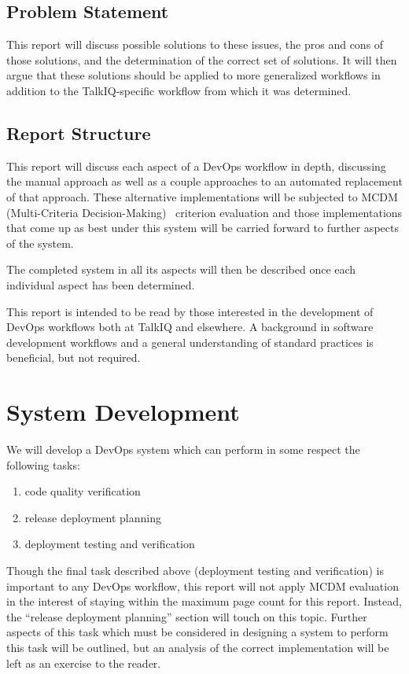 \documentclass[12pt]{article}
\begin{document}
\subsection{Problem Statement}
This report will discuss possible solutions to these issues, the pros and cons of those solutions, and the determination of the correct set of solutions. It will then argue that these solutions should be applied to more generalized workflows in addition to the TalkIQ-specific workflow from which it was determined.

\subsection{Report Structure}
This report will discuss each aspect of a DevOps workflow in depth, discussing the manual approach as well as a couple approaches to an automated replacement of that approach. These alternative implementations will be subjected to MCDM (Multi-Criteria Decision-Making)~\cite{mcda} criterion evaluation and those implementations that come up as best under this system will be carried forward to further aspects of the system.

The completed system in all its aspects will then be described once each individual aspect has been determined.

This report is intended to be read by those interested in the development of DevOps workflows both at TalkIQ and elsewhere. A background in software development workflows and a general understanding of standard practices is beneficial, but not required.
\newpage


\section{System Development}
We will develop a DevOps system which can perform in some respect the following tasks:
\begin{enumerate}
\item code quality verification
\item release deployment planning
\item deployment testing and verification
\end{enumerate}

Though the final task described above (deployment testing and verification) is important to any DevOps workflow, this report will not apply MCDM evaluation in the interest of staying within the maximum page count for this report. Instead, the ``release deployment planning'' section will touch on this topic. Further aspects of this task which must be considered in designing a system to perform this task will be outlined, but an analysis of the correct implementation will be left as an exercise to the reader.
\end{document}
